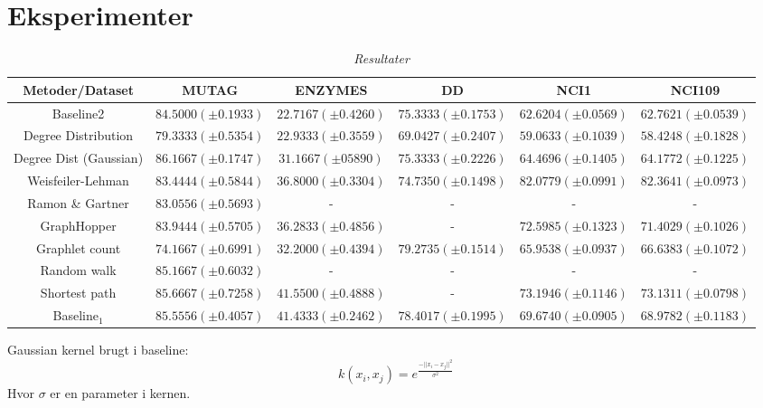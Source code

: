 \documentclass{article}
\begin{document}
\section{Eksperimenter}
\begin{table}[H]
\begin{center}
\scalebox{0.7} {
\begin{tabular}{c|c|c|c|c|c}
Metoder/Dataset & MUTAG & ENZYMES & DD & NCI1 & NCI109 \\
\hline
Baseline2 & $84.5000 (\pm 0.1933)$ & $22.7167 (\pm 0.4260)$ & $75.3333 (\pm 0.1753)$ & $62.6204 (\pm 0.0569)$ & $62.7621 (\pm 0.0539)$ \\
Degree Distribution & $79.3333 (\pm 0.5354)$ & $22.9333 (\pm 0.3559)$ & $69.0427 (\pm 0.2407)$ & $59.0633 (\pm 0.1039)$ & $58.4248 (\pm 0.1828)$ \\
Degree Dist (Gaussian) & $86.1667 (\pm 0.1747)$ & $31.1667 (\pm 05890)$  & $75.3333 (\pm 0.2226)$ & $64.4696 (\pm 0.1405)$ & $64.1772 (\pm 0.1225)$ \\
Weisfeiler-Lehman & $83.4444 (\pm 0.5844)$ & $36.8000 (\pm 0.3304)$ & $74.7350 (\pm 0.1498)$ & $82.0779 (\pm 0.0991)$ &  $82.3641 (\pm 0.0973)$ \\
Ramon \& Gartner & $83.0556 (\pm 0.5693)$ & - & - & - & - \\
GraphHopper & $83.9444 (\pm 0.5705)$ & $36.2833 (\pm 0.4856)$ & - & $72.5985 (\pm 0.1323)$ & $71.4029 (\pm 0.1026)$ \\
Graphlet count & $74.1667 (\pm 0.6991)$ & $32.2000 (\pm 0.4394)$ & $79.2735 (\pm 0.1514)$ & $65.9538 (\pm 0.0937)$ & $66.6383 (\pm 0.1072)$ \\
Random walk & $85.1667 (\pm 0.6032)$ & - & - & - & - \\
Shortest path & $85.6667 (\pm 0.7258)$ & $41.5500 (\pm 0.4888)$ & - & $73.1946 (\pm 0.1146)$ & $73.1311 (\pm 0.0798)$ \\
Baseline$_1$ & $85.5556(\pm 0.4057)$ & $41.4333(\pm 0.2462)$ & $78.4017(\pm 0.1995)$ & $69.6740(\pm 0.0905)$ & $68.9782(\pm 0.1183)$
\end{tabular}
}
\caption{\textit{Resultater}}
\end{center}
\end{table}

Gaussian kernel brugt i baseline:
$$k(x_i,x_j)=e^{\frac{-||x_i-x_j||^2}{\sigma^2}}$$
Hvor $\sigma$ er en parameter i kernen.
\end{document}

